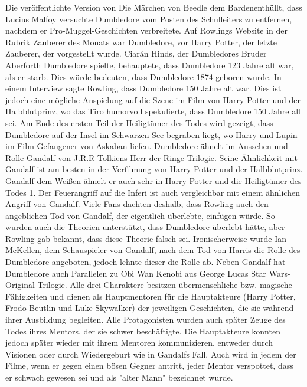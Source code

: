 \documentclass[a4paper, 10pt]{article}
\begin{document}
\vspace{10pt}
\newline
Die veröffentlichte Version von Die Märchen von Beedle dem Bardenenthüllt, dass Lucius Malfoy versuchte Dumbledore vom 
Posten des Schulleiters zu entfernen, nachdem er Pro-Muggel-Geschichten verbreitete.
Auf Rowlings Website in der Rubrik Zauberer des Monats war Dumbledore, vor Harry Potter, der letzte Zauberer, der vorgestellt wurde.
\vspace{10pt}
\newline
Ciarán Hinds, der Dumbledores Bruder Aberforth Dumbledore spielte, behauptete, dass Dumbledore 123 Jahre alt war, als er starb. Dies würde bedeuten, dass Dumbledore 1874 geboren wurde.
In einem Interview sagte Rowling, dass Dumbledore 150 Jahre alt war. Dies ist jedoch eine mögliche Anspielung auf die Szene im Film von Harry Potter und der Halbblutprinz, wo das Tiro humorvoll spekulierte, dass Dumbledore 150 Jahre alt sei.
\vspace{10pt}
\newline
Am Ende des ersten Teil der Heiligtümer des Todes wird gezeigt, dass Dumbledore auf der Insel im Schwarzen See begraben liegt, wo Harry und Lupin im Film Gefangener von Askaban liefen.
Dumbledore ähnelt im Aussehen und Rolle Gandalf von J.R.R Tolkiens Herr der Ringe-Trilogie. Seine Ähnlichkeit mit Gandalf ist am besten in der Verfilmung von Harry Potter und der Halbblutprinz. Gandalf dem Weißen ähnelt er auch sehr in Harry Potter und die Heiligtümer des Todes 1. Der Feuerangriff auf die Inferi ist auch vergleichbar mit einem ähnlichen Angriff von Gandalf. Viele Fans dachten deshalb, dass Rowling auch den angeblichen Tod von Gandalf, der eigentlich überlebte, einfügen würde. So wurden auch die Theorien unterstützt, dass Dumbledore überlebt hätte, aber Rowling gab bekannt, dass diese Theorie falsch sei. Ironischerweise wurde Ian McKellen, dem Schauspieler von Gandalf, nach dem Tod von Harris die Rolle des Dumbledore angeboten, jedoch lehnte dieser die Rolle ab.
\vspace{10pt}
\newline
Neben Gandalf hat Dumbledore auch Parallelen zu Obi Wan Kenobi aus George Lucas Star Wars-Original-Trilogie. Alle drei Charaktere besitzen übermenschliche bzw. magische Fähigkeiten und dienen als Hauptmentoren für die Hauptakteure (Harry Potter, Frodo Beutlin und Luke Skywalker) der jeweiligen Geschichten, die sie während ihrer Ausbildung begleiten. Alle Protagonisten wurden auch später Zeuge des Todes ihres Mentors, der sie schwer beschäftigte. Die Hauptakteure konnten jedoch später wieder mit ihrem Mentoren kommunizieren, entweder durch Visionen oder durch Wiedergeburt wie in Gandalfs Fall. Auch wird in jedem der Filme, wenn er gegen einen bösen Gegner antritt, jeder Mentor verspottet, dass er schwach gewesen sei und als "alter Mann" bezeichnet wurde.
\end{document}
